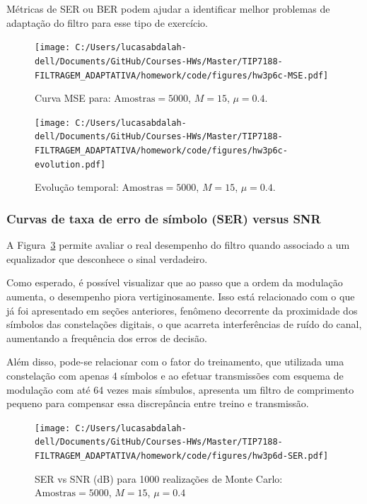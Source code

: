 Métricas de SER ou BER podem ajudar a identificar melhor problemas de adaptação do filtro para esse tipo de exercício.
    
\begin{figure}[!htp]
    \centering
    \texttt{[image: C:/Users/lucasabdalah-dell/Documents/GitHub/Courses-HWs/Master/TIP7188-FILTRAGEM\_ADAPTATIVA/homework/code/figures/hw3p6c-MSE.pdf]}
    \caption{Curva MSE para: $\text{Amostras} = 5000$, $M = 15$, $\mu = 0.4$.}
    \label{fig:hw3p6c-MSE}
\end{figure}

\begin{figure}[!htp]
    \centering
    \texttt{[image: C:/Users/lucasabdalah-dell/Documents/GitHub/Courses-HWs/Master/TIP7188-FILTRAGEM\_ADAPTATIVA/homework/code/figures/hw3p6c-evolution.pdf]}
    \caption{Evolução temporal: $\text{Amostras} = 5000$, $M = 15$, $\mu = 0.4$.}
    \label{fig:hw3p6c-evolution}
\end{figure}

\clearpage

\subsubsection*{Curvas de taxa de erro de símbolo (SER) versus SNR}
A Figura~\ref{fig:hw3p6d-SER} permite avaliar o real desempenho do filtro quando associado a um equalizador que desconhece o sinal verdadeiro.

Como esperado, é possível visualizar que ao passo que a ordem da modulação aumenta, o desempenho piora vertiginosamente. Isso está relacionado com o que já foi apresentado em seções anteriores, fenômeno decorrente da proximidade dos símbolos das constelações digitais, o que acarreta interferências de ruído do canal, aumentando a frequência dos erros de decisão.

Além disso, pode-se relacionar com o fator do treinamento, que utilizada uma constelação com apenas 4 símbolos e ao efetuar transmissões com esquema de modulação com até 64 vezes mais símbulos, apresenta um filtro de comprimento pequeno para compensar essa discrepância entre treino e transmissão.
    
\begin{figure}[!htp]
    \centering
    \texttt{[image: C:/Users/lucasabdalah-dell/Documents/GitHub/Courses-HWs/Master/TIP7188-FILTRAGEM\_ADAPTATIVA/homework/code/figures/hw3p6d-SER.pdf]}
    \caption{SER vs SNR (dB) para 1000 realizações de Monte Carlo: $\text{Amostras} = 5000$, $M = 15$, $\mu = 0.4$}
    \label{fig:hw3p6d-SER}
\end{figure}
